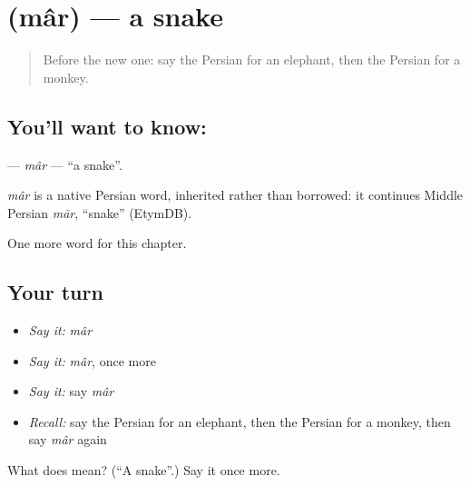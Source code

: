 \section[\texorpdfstring{\fa{مار} (mâr)}{مار (mâr)}]{ (mâr) — a snake}

\label{lesson:FA-C56-mar}



\begin{quote}
Before the new one: say the Persian for an elephant, then the Persian for a monkey.
\end{quote}

\subsection*{You'll want to know: }
\textbf{} — \emph{mâr} — \textquotedblleft{}a snake\textquotedblright{}.

\begin{cousinweb}
\emph{mâr} is a native Persian word, inherited rather than borrowed: it continues Middle Persian \emph{mār}, \textquotedblleft{}snake\textquotedblright{} (EtymDB).
\end{cousinweb}

\begin{grammarlens}[title={What you've built}]
One more word for this chapter.
\end{grammarlens}

\subsection*{Your turn}
\begin{itemize}
\raggedright
  \item \emph{Say it:} \emph{mâr}
  \item \emph{Say it:} \emph{mâr}, once more
  \item \emph{Say it:} say \emph{mâr}
  \item \emph{Recall:} say the Persian for an elephant, then the Persian for a monkey, then say \emph{mâr} again
\end{itemize}

\begin{tcolorbox}[breakable,colback=teal!4,colframe=teal!35!black,title={Before you move on}]
What does  mean? (\textquotedblleft{}A snake\textquotedblright{}.) Say it once more.
\end{tcolorbox}
